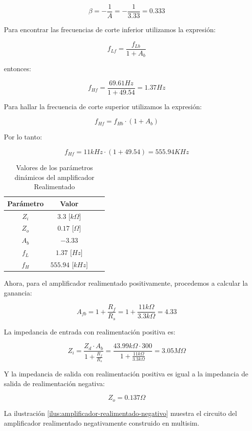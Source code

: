 $$\beta = -\frac{1}{A} = -\frac{1}{3.33} = 0.333$$

Para encontrar las frecuencias de corte inferior utilizamos la expresión:

$$f_{Lf} = \frac{f_{Lb}}{1 + A_{b}}$$

entonces:

$$f_{Hf} = \frac{69.61 Hz}{1 + 49.54} = 1.37 Hz$$

Para hallar la frecuencia de corte superior utilizamos la expresión:

$$f_{Hf} = f_{Hb}\cdot (1 + A_{b})$$

Por lo tanto:

$$f_{Hf} = 11kHz\cdot (1 + 49.54) = 555.94KHz$$

\begin{table}[ht]
    \centering
    \begin{tabular}{|c|c|c|c|}
        \hline
        \textbf{Parámetro} & \textbf{Valor} \\ \hline
        $Z_i$ & $3.3$ [$k\Omega$] \\ \hline
        $Z_o$ & $0.17 $ [$\Omega$] \\ \hline
        $A_b$ & $-3.33$ \\ \hline
        $f_L$ & $1.37$ [$Hz$] \\ \hline
        $f_H$ & $555.94$ [$kHz$] \\ \hline
    \end{tabular}
    \caption{Valores de los parámetros dinámicos del amplificador Realimentado}
    \label{tab:amplificador-base-dinamico}

\end{table}

Ahora, para el amplificador realimentado positivamente, procedemos a calcular la ganancia:

$$A_{fb} = 1 + \frac{R_f}{R_s} = 1 + \frac{11k\Omega}{3.3k\Omega} = 4.33$$

La impedancia de entrada con realimentación positiva es:

$$ Z_i = \frac{Z_d \cdot A_b}{1 + \frac{R_f}{R_s}} = \frac{43.99k\Omega \cdot 300}{1 + \frac{11k\Omega}{3.3k\Omega}} = 3.05M\Omega$$

Y la impedancia de salida con realimentación positiva es igual a la impedancia de salida de realimentación negativa:

$$Z_o = 0.137 \Omega$$

La ilustración \ref{ilus:amplificador-realimentado-negativo} muestra el circuito del amplificador realimentado negativamente construido en multisim.

